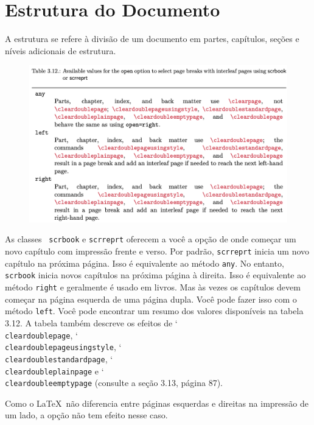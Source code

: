 \chapter{Estrutura do Documento}
A estrutura se refere à divisão de um documento em partes, capítulos, seções e níveis adicionais de estrutura.
\begin{figure}[h]
    \centering
    \includegraphics[width=0.9\linewidth]{imagens/imagem17.png}
    \label{fig:3_12}
\end{figure}

As classes \KOMAScript\ \texttt{scrbook} e \texttt{scrreprt} oferecem a você a opção de onde começar um novo capítulo com impressão frente e verso. Por padrão, \texttt{scrreprt} inicia um novo capítulo na próxima página. Isso é equivalente ao método \texttt{any}. No entanto, \texttt{scrbook} inicia novos capítulos na próxima página à direita. Isso é equivalente ao método \texttt{right} e geralmente é usado em livros. Mas às vezes os capítulos devem começar na página esquerda de uma página dupla. Você pode fazer isso com o método \texttt{left}. Você pode encontrar um resumo dos valores disponíveis na tabela 3.12. A tabela também descreve os efeitos de \char`\\\texttt{clear\-dou\-ble\-pa\-ge}, \char`\\\texttt{clear\-dou\-ble\-pa\-ge\-u\-sing\-sty\-le}, \char`\\\texttt{clear\-dou\-ble\-stan\-dard\-pa\-ge}, \char`\\\texttt{clear\-dou\-ble\-plain\-pa\-ge} e \char`\\\texttt{clear\-dou\-ble\-empty\-pa\-ge} (consulte a seção 3.13, página 87).

Como o \LaTeX\ não diferencia entre páginas esquerdas e direitas na impressão de um lado, a opção não tem efeito nesse caso.

